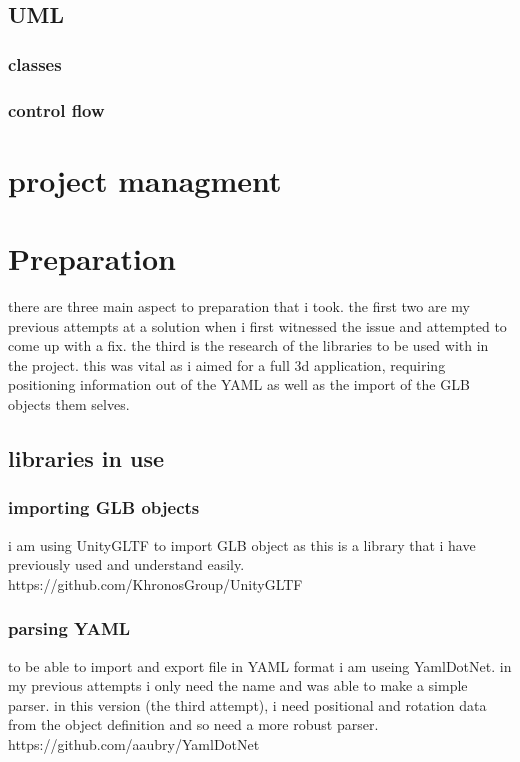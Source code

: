 \subsection{UML}
\subsubsection{classes}
\subsubsection{control flow}

\section{project managment}

\section{Preparation}
there are three main aspect to preparation that i took. the first two are my previous attempts at a solution when i first witnessed the issue and attempted to come up with a fix. the third is the research of the libraries to be used with in the project. this was vital as i aimed for a full 3d application, requiring positioning information out of the YAML as well as the import of the GLB objects them selves.
\subsection {libraries in use}

\subsubsection*{importing GLB objects}
i am using UnityGLTF to import GLB object as this is a library that i have previously used and understand easily.\\
https://github.com/KhronosGroup/UnityGLTF
\subsubsection*{parsing YAML}
to be able to import and export file in YAML format i am useing YamlDotNet. in my previous attempts i only need the name and was able to make a simple parser. in this version (the third attempt), i need positional and rotation data from the object definition and so need a more robust parser. \\
https://github.com/aaubry/YamlDotNet

